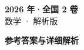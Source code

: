 \documentclass[zihao=-4, a4paper]{ctexart}
\begin{document}
\begin{center}
  {\Large\bfseries 2026 年·全国 2 卷}\\[4pt]
  {\large 数学 · 解析版}
\end{center}
\medskip
{}

\clearpage
{}
\begin{center}{\Large\bfseries 参考答案与详细解析}\end{center}
\medskip

\end{document}
